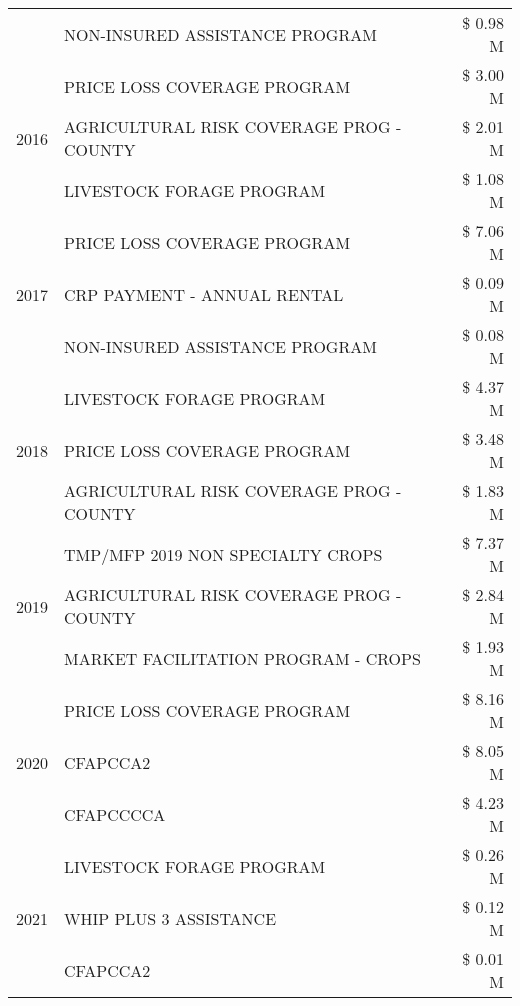 \begin{tabular}{llr}
 & NON-INSURED ASSISTANCE PROGRAM & \$ 0.98 M \\
\cline{1-3}
\multirow[t]{3}{*}{2016} & PRICE LOSS COVERAGE PROGRAM & \$ 3.00 M \\
 & AGRICULTURAL RISK COVERAGE PROG - COUNTY & \$ 2.01 M \\
 & LIVESTOCK FORAGE PROGRAM & \$ 1.08 M \\
\cline{1-3}
\multirow[t]{3}{*}{2017} & PRICE LOSS COVERAGE PROGRAM & \$ 7.06 M \\
 & CRP PAYMENT - ANNUAL RENTAL & \$ 0.09 M \\
 & NON-INSURED ASSISTANCE PROGRAM & \$ 0.08 M \\
\cline{1-3}
\multirow[t]{3}{*}{2018} & LIVESTOCK FORAGE PROGRAM & \$ 4.37 M \\
 & PRICE LOSS COVERAGE PROGRAM & \$ 3.48 M \\
 & AGRICULTURAL RISK COVERAGE PROG - COUNTY & \$ 1.83 M \\
\cline{1-3}
\multirow[t]{3}{*}{2019} & TMP/MFP 2019 NON SPECIALTY CROPS & \$ 7.37 M \\
 & AGRICULTURAL RISK COVERAGE PROG - COUNTY & \$ 2.84 M \\
 & MARKET FACILITATION PROGRAM - CROPS & \$ 1.93 M \\
\cline{1-3}
\multirow[t]{3}{*}{2020} & PRICE LOSS COVERAGE PROGRAM & \$ 8.16 M \\
 & CFAPCCA2 & \$ 8.05 M \\
 & CFAPCCCCA & \$ 4.23 M \\
\cline{1-3}
\multirow[t]{3}{*}{2021} & LIVESTOCK FORAGE PROGRAM & \$ 0.26 M \\
 & WHIP PLUS 3 ASSISTANCE & \$ 0.12 M \\
 & CFAPCCA2 & \$ 0.01 M \\
\cline{1-3}
\bottomrule
\end{tabular}
